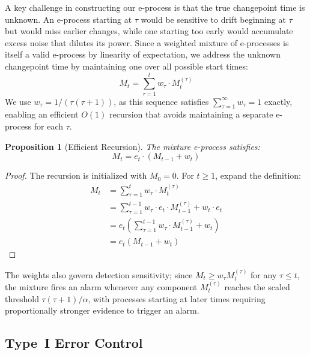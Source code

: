\documentclass[ejsv2, noshowframe]{imsart}
\theoremstyle{plain}
\newtheorem{proposition}{Proposition}
\theoremstyle{definition}
\theoremstyle{remark}
\begin{document}
A key challenge in constructing our e-process is that the true changepoint time is unknown. An e-process starting at $\tau$ would be sensitive to drift beginning at $\tau$ but would miss earlier changes, while one starting too early would accumulate excess noise that dilutes its power. Since a weighted mixture of e-processes is itself a valid e-process by linearity of expectation, we address the unknown changepoint time by maintaining one over all possible start times:
\begin{equation}
 M_t = \sum_{\tau=1}^{t} w_\tau \cdot M_t^{(\tau)}
\end{equation}
We use $w_\tau = 1/(\tau(\tau+1))$, as this sequence satisfies $\sum_{\tau=1}^{\infty} w_\tau = 1$ exactly, enabling an efficient $O(1)$ recursion that avoids maintaining a separate e-process for each $\tau$.
\begin{proposition}[Efficient Recursion]
The mixture e-process satisfies:
\begin{equation}
 M_t = e_t \cdot (M_{t-1} + w_t)
\end{equation}
\end{proposition}
\begin{proof}
The recursion is initialized with $M_0 = 0$. For $t \ge 1$, expand the definition:
\begin{align*}
M_t &= \sum_{\tau=1}^{t} w_\tau \cdot M_t^{(\tau)} \\
&= \sum_{\tau=1}^{t-1} w_\tau \cdot e_t \cdot M_{t-1}^{(\tau)} + w_t \cdot e_t \\
&= e_t \left( \sum_{\tau=1}^{t-1} w_\tau \cdot M_{t-1}^{(\tau)} + w_t \right) \\
&= e_t (M_{t-1} + w_t)
\end{align*}
\end{proof}

\noindent The weights also govern detection sensitivity; since $M_t \ge w_\tau M_t^{(\tau)}$ for any $\tau \le t$, the mixture fires an alarm whenever any component $M_t^{(\tau)}$ reaches the scaled threshold $\tau(\tau+1)/\alpha$, with processes starting at later times requiring proportionally stronger evidence to trigger an alarm.

\subsection{Type~I Error Control}
\end{document}
